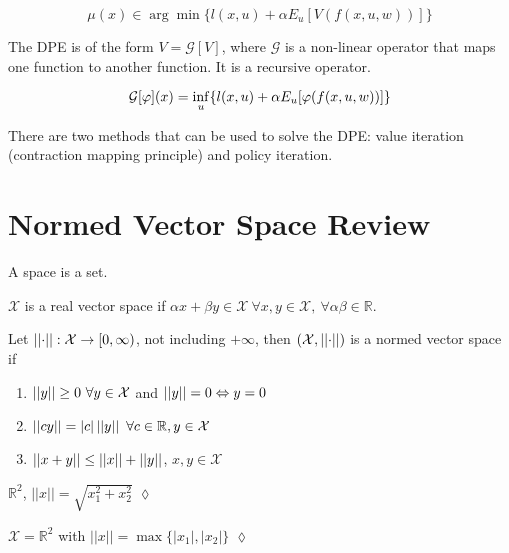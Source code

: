\begin{equation*}
\mu(x)\in\arg\min\{l(x,u)+\alpha E_u[V(f(x,u,w))]\}
\end{equation*}

The DPE is of the form $V=\mathcal{G}[V]$, where $\mathcal{G}$ is a non-linear operator that maps one function to another function.
It is a recursive operator.

\begin{equation*}
\mathcal{G}[\varphi](x) = \inf_u\{l(x,u)+\alpha E_u[\varphi(f(x,u,w))]\}
\end{equation*}

There are two methods that can be used to solve the DPE\@: value iteration (contraction mapping principle) and policy iteration.

\section{Normed Vector Space Review}%
\label{sec:normedvectorspace}
\begin{definition}
A space is a set.
\end{definition}

\begin{definition}
$\mathcal{X}$ is a real vector space if $\alpha x+\beta y\in\mathcal{X}~\forall x,y\in\mathcal{X},~\forall \alpha\beta\in\mathbb{R}$.
\end{definition}

\begin{definition}
Let $\left|\left|\cdot\right|\right|: \mathcal{X}\to[0,\infty)$, not including $+\infty$, then $(\mathcal{X},\left|\left|\cdot\right|\right|)$ is a normed vector space if%
\begin{enumerate}
\item $\left|\left|y\right|\right|\geq0~\forall y\in\mathcal{X}$ and $\left|\left|y\right|\right|=0\Leftrightarrow y=0$
\item $||cy|| = |c|\left|\left|y\right|\right|~\forall c\in\mathbb{R}, y\in\mathcal{X}$
\item $\left|\left|x+y\right|\right|\leq ||x|| + ||y||$, $x,y\in\mathcal{X}$
\end{enumerate}
\end{definition}

\begin{example}
$\mathbb{R}^2$, $||x||=\sqrt{x_1^2+x_2^2}$
$\lozenge$
\end{example}

\begin{example}
$\mathcal{X}=\mathbb{R}^2$ with $||x|| = \max\{|x_1|,|x_2|\}$
$\lozenge$
\end{example}

